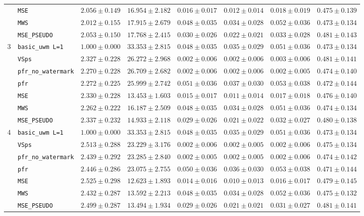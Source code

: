 \documentclass{article}
\theoremstyle{plain}
\theoremstyle{definition}
\begin{document}
\begin{table}[!htbp]
{\begin{tabular}{llcccccc}
 & \texttt{MSE} & $2.056 \pm 0.149$ & $16.954 \pm 2.182$ & $0.016 \pm 0.017$ & $0.012 \pm 0.014$ & $0.018 \pm 0.019$ & $0.475 \pm 0.139$ \\
 & \texttt{MWS} & $2.012 \pm 0.155$ & $17.915 \pm 2.679$ & $0.048 \pm 0.035$ & $0.034 \pm 0.028$ & $0.052 \pm 0.036$ & $0.473 \pm 0.134$ \\
 & \texttt{MSE\_PSEUDO} & $2.053 \pm 0.150$ & $17.768 \pm 2.415$ & $0.030 \pm 0.026$ & $0.022 \pm 0.021$ & $0.033 \pm 0.028$ & $0.481 \pm 0.143$ \\
\midrule
3 & \texttt{basic\_uwm L=1} & $1.000 \pm 0.000$ & $33.353 \pm 2.815$ & $0.048 \pm 0.035$ & $0.035 \pm 0.029$ & $0.051 \pm 0.036$ & $0.473 \pm 0.134$ \\
 & \texttt{VSps} & $2.327 \pm 0.228$ & $26.272 \pm 2.968$ & $0.002 \pm 0.006$ & $0.002 \pm 0.006$ & $0.003 \pm 0.006$ & $0.481 \pm 0.141$ \\
 & \texttt{pfr\_no\_watermark} & $2.270 \pm 0.228$ & $26.709 \pm 2.682$ & $0.002 \pm 0.006$ & $0.002 \pm 0.006$ & $0.002 \pm 0.005$ & $0.474 \pm 0.140$ \\
 & \texttt{pfr} & $2.272 \pm 0.225$ & $25.999 \pm 2.742$ & $0.051 \pm 0.036$ & $0.037 \pm 0.030$ & $0.053 \pm 0.038$ & $0.472 \pm 0.144$ \\
 & \texttt{MSE} & $2.330 \pm 0.228$ & $13.453 \pm 1.603$ & $0.015 \pm 0.017$ & $0.011 \pm 0.014$ & $0.017 \pm 0.018$ & $0.476 \pm 0.140$ \\
 & \texttt{MWS} & $2.262 \pm 0.222$ & $16.187 \pm 2.509$ & $0.048 \pm 0.035$ & $0.034 \pm 0.028$ & $0.051 \pm 0.036$ & $0.474 \pm 0.134$ \\
 & \texttt{MSE\_PSEUDO} & $2.337 \pm 0.232$ & $14.933 \pm 2.118$ & $0.029 \pm 0.026$ & $0.021 \pm 0.022$ & $0.032 \pm 0.027$ & $0.480 \pm 0.138$ \\
\midrule
4 & \texttt{basic\_uwm L=1} & $1.000 \pm 0.000$ & $33.353 \pm 2.815$ & $0.048 \pm 0.035$ & $0.035 \pm 0.029$ & $0.051 \pm 0.036$ & $0.473 \pm 0.134$ \\
 & \texttt{VSps} & $2.513 \pm 0.288$ & $23.229 \pm 3.176$ & $0.002 \pm 0.006$ & $0.002 \pm 0.005$ & $0.002 \pm 0.006$ & $0.475 \pm 0.134$ \\
 & \texttt{pfr\_no\_watermark} & $2.439 \pm 0.292$ & $23.285 \pm 2.840$ & $0.002 \pm 0.005$ & $0.002 \pm 0.005$ & $0.002 \pm 0.006$ & $0.474 \pm 0.142$ \\
 & \texttt{pfr} & $2.446 \pm 0.286$ & $23.075 \pm 2.755$ & $0.050 \pm 0.036$ & $0.036 \pm 0.030$ & $0.053 \pm 0.038$ & $0.471 \pm 0.144$ \\
 & \texttt{MSE} & $2.525 \pm 0.298$ & $12.623 \pm 1.893$ & $0.014 \pm 0.016$ & $0.010 \pm 0.013$ & $0.016 \pm 0.017$ & $0.479 \pm 0.145$ \\
 & \texttt{MWS} & $2.432 \pm 0.287$ & $13.592 \pm 2.213$ & $0.048 \pm 0.035$ & $0.034 \pm 0.028$ & $0.052 \pm 0.036$ & $0.475 \pm 0.132$ \\
 & \texttt{MSE\_PSEUDO} & $2.499 \pm 0.287$ & $13.494 \pm 1.934$ & $0.029 \pm 0.026$ & $0.021 \pm 0.021$ & $0.031 \pm 0.027$ & $0.481 \pm 0.141$ \\
\bottomrule
\end{tabular}
}
\end{table}
\end{document}

